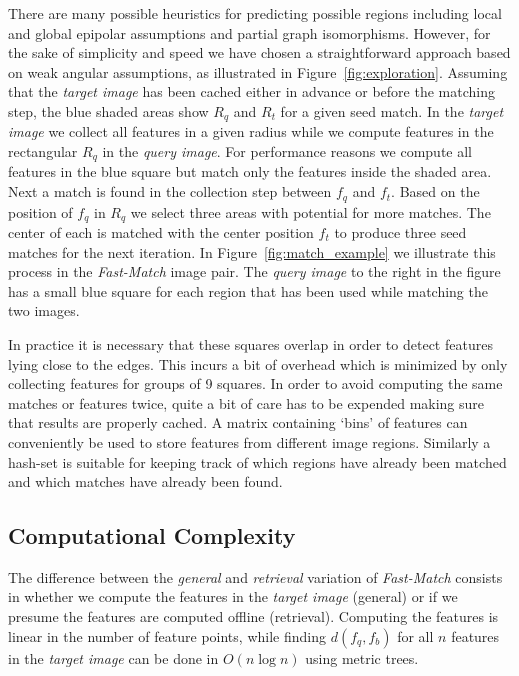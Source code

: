 \documentclass[10pt,twocolumn,letterpaper]{article}
\begin{document}
There are many possible heuristics for predicting possible regions including local and global epipolar assumptions and partial graph isomorphisms. However, for the sake of simplicity and speed we have chosen a straightforward approach based on weak angular assumptions, as illustrated in Figure~\ref{fig:exploration}. Assuming that the \emph{target image} has been cached either in advance or before the matching step, the blue shaded areas show $R_q$ and $R_t$ for a given seed match. In the \emph{target image} we collect all features in a given radius while we compute features in the rectangular $R_q$ in the \emph{query image}. For performance reasons we compute all features in the blue square but match only the features inside the shaded area. Next a match is found in the collection step between $f_q$ and $f_t$. Based on the position of $f_q$ in $R_q$ we select three areas with potential for more matches. The center of each is matched with the center position $f_t$ to produce three seed matches for the next iteration. In Figure~\ref{fig:match_example} we illustrate this process in the \emph{Fast-Match} image pair. The \emph{query image} to the right in the figure has a small blue square for each region that has been used while matching the two images.

In practice it is necessary that these squares overlap in order to detect features lying close to the edges. This incurs a bit of overhead which is minimized by only collecting features for groups of 9 squares. In order to avoid computing the same matches or features twice, quite a bit of care has to be expended making sure that results are properly cached. A matrix containing `bins' of features can conveniently be used to store features from different image regions. Similarly a hash-set is suitable for keeping track of which regions have already been matched and which matches have already been found.

\subsection{Computational Complexity}
\label{complexity}
%
The difference between the \emph{general} and \emph{retrieval} variation of \emph{Fast-Match} consists in whether we compute the features in the \emph{target image} (general) or if we presume the features are computed offline (retrieval). Computing the features is linear in the number of feature points, while finding $d(f_q, f_b)$ for all $n$ features in the \emph{target image} can be done in $O(n\log n)$ using metric trees. 
\end{document}
